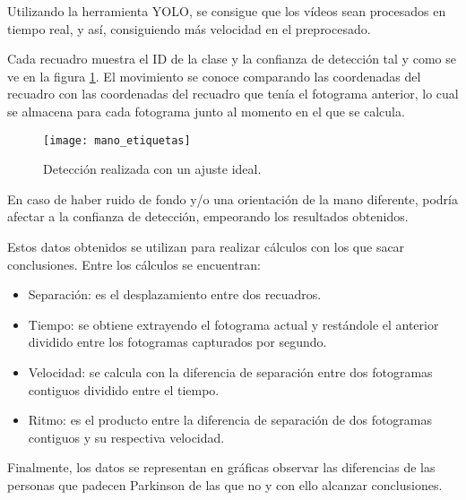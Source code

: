 Utilizando la herramienta YOLO, se consigue que los vídeos sean procesados en tiempo real, y así, consiguiendo más velocidad en el preprocesado.

Cada recuadro muestra el ID de la clase y la confianza de detección tal y como se ve en la figura \ref{manoetiquetas}. El movimiento se conoce comparando las coordenadas del recuadro con las coordenadas del recuadro que tenía el fotograma anterior, lo cual se almacena para cada fotograma junto al momento en el que se calcula.

\begin{figure}[]
	\texttt{[image: mano\_etiquetas]}
	\caption{Detección realizada con un ajuste ideal.\cite{jaber2021proposing}}
	\label{manoetiquetas}
\end{figure}

En caso de haber ruido de fondo y/o una orientación de la mano diferente, podría afectar a la confianza de detección, empeorando los resultados obtenidos.

Estos datos obtenidos se utilizan para realizar cálculos con los que sacar conclusiones. Entre los cálculos se encuentran:

\begin{itemize}
	\item Separación: es el desplazamiento entre dos recuadros.
	\item Tiempo: se obtiene extrayendo el fotograma actual y restándole el anterior dividido entre los fotogramas capturados por segundo.
	\item Velocidad: se calcula con la diferencia de separación entre dos fotogramas contiguos dividido entre el tiempo.
	\item Ritmo: es el producto entre la diferencia de separación de dos fotogramas contiguos y su respectiva velocidad.
\end{itemize}

Finalmente, los datos se representan en gráficas observar las diferencias de las personas que padecen Parkinson de las que no y con ello alcanzar conclusiones.


